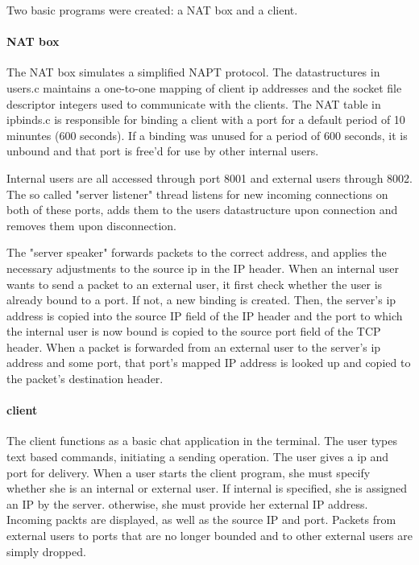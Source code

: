 \documentclass{article}
\begin{document}
Two basic programs were created: a NAT box and a client.  

\paragraph{NAT box} The NAT box simulates a simplified NAPT protocol.  The datastructures in users.c maintains a one-to-one mapping of client ip addresses and the socket file descriptor integers used to communicate with the clients.  The NAT table in ipbinds.c is responsible for binding a client with a port for a default period of 10 minuntes (600 seconds).  If a binding was unused for a period of 600 seconds, it is unbound and that port is free'd for use by other internal users. 

Internal users are all accessed through port 8001 and external users through 8002.  The so called "server listener" thread listens for new incoming connections on both of these ports, adds them to the users datastructure upon connection and removes them upon disconnection.  

The "server speaker" forwards packets to the correct address, and applies the necessary adjustments to the source ip in the IP header.  When an internal user wants to send a packet to an external user, it first check whether the user is already bound to a port.  If not, a new binding is created.  Then, the server's ip address is copied into the source IP field of the IP header and the port to which the internal user is now bound is copied to the source port field of the TCP header.  When a packet is forwarded from an external user to the server's ip address and some port, that port's mapped IP address is looked up and copied to the packet's destination header.  

\paragraph{client}
The client functions as a basic chat application in the terminal.  The user types text based commands, initiating a sending operation.  The user gives a ip and port for delivery.  When a user starts the client program, she must specify whether she is an internal or external user.  If internal is specified, she is assigned an IP by the server.  otherwise, she must provide her external IP address.  Incoming packts are displayed, as well as the source IP and port. Packets from external users to ports that are no longer bounded and to other external users are simply dropped. 
\end{document}
